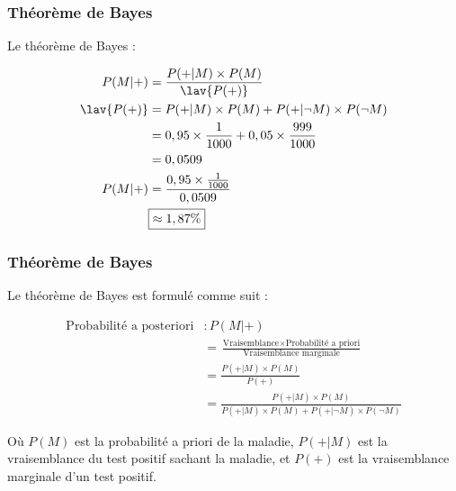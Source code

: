 \documentclass[xcolor=dvipsnames, mathserif, 10pt, aspectratio=169, handout]{beamer}
\begin{document}

\begin{frame}
  \frametitle{Théorème de Bayes}
  
  Le théorème de Bayes :
  
  \begin{align*}
    P(M|+) &= \frac{P(+|M) \times P(M)}{\lav{P(+)}} \\
    \lav{P(+)}   &= P(+|M) \times P(M) + P(+|\neg M) \times P(\neg M) \\
           &= 0,95 \times \frac{1}{1000} + 0,05 \times \frac{999}{1000} \\
           &= 0,0509 \\
    P(M|+) &= \frac{0,95 \times \frac{1}{1000}}{0,0509} \\
           &\boxed{\approx 1,87\%}    
  \end{align*}
  
  \vfill
\vfill  



\end{frame}



\begin{frame}
  \frametitle{Théorème de Bayes}
  
  Le théorème de Bayes est formulé comme suit :
  
  \begin{align*}
    \text{Probabilité a posteriori} &: P(M|+) \\
    &= \frac{\text{Vraisemblance} \times \text{Probabilité a priori}}{\text{Vraisemblance marginale}} \\
    &= \frac{P(+|M) \times P(M)}{P(+)} \\
    &= \frac{P(+|M) \times P(M)}{P(+|M) \times P(M) + P(+|\neg M) \times P(\neg M)}
  \end{align*}
  
  Où \( P(M) \) est la probabilité a priori de la maladie, \( P(+|M) \) est la vraisemblance du test positif sachant la maladie, et \( P(+) \) est la vraisemblance marginale d'un test positif.


\vfill
\vfill  



\end{frame}

\end{document}
